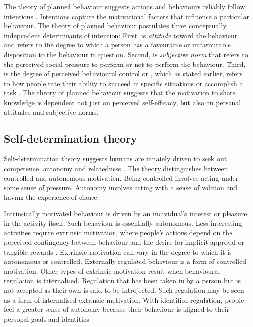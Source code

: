 The theory of planned behaviour suggests actions and behaviours reliably follow intentions \citep{ajzen1985intentions}. Intentions capture the motivational factors that influence a particular behaviour. The theory of planned behaviour postulates three conceptually independent determinants of intention: First, is \emph{attitude} toward the behaviour and refers to the degree to which a person has a favourable or unfavourable disposition to the behaviour in question. Second, is \emph{subjective norm} that refers to the perceived social pressure to perform or not to perform the behaviour. Third, is the degree of perceived behavioural control or , which as stated earlier, refers to how people rate their ability to succeed in specific situations or accomplish a task \citep{bandura1982self,ajzen1991theory}. The theory of planned behaviour suggests that the motivation to share knowledge is dependent not just on perceived self-efficacy, but also on personal attitudes and subjective norms. \medskip

\subsection{Self-determination theory}

Self-determination theory suggests humans are innately driven to seek out competence, autonomy and relatedness \citep{ryan2000self}. The theory distinguishes between controlled and autonomous motivation. Being controlled involves acting under some sense of pressure. Autonomy involves acting with a sense of volition and having the experience of choice. \medskip

Intrinsically motivated behaviour is driven by an individual’s interest or pleasure in the activity itself. Such behaviour is essentially autonomous. Less interesting activities require extrinsic motivation, where people's actions depend on the perceived contingency between behaviour and the desire for implicit approval or tangible rewards \citep{gagne2005self}. Extrinsic motivation can vary in the degree to which it is autonomous or controlled. Externally regulated behaviour is a form of controlled motivation. Other types of extrinsic motivation result when behavioural regulation is internalised. Regulation that has been taken in by a person but is not accepted as their own is said to be introjected. Such regulation may be seen as a form of internalised extrinsic motivation. With identified regulation, people feel a greater sense of autonomy because their behaviour is aligned to their personal goals and identities \citep{gagne2005self}. \medskip

